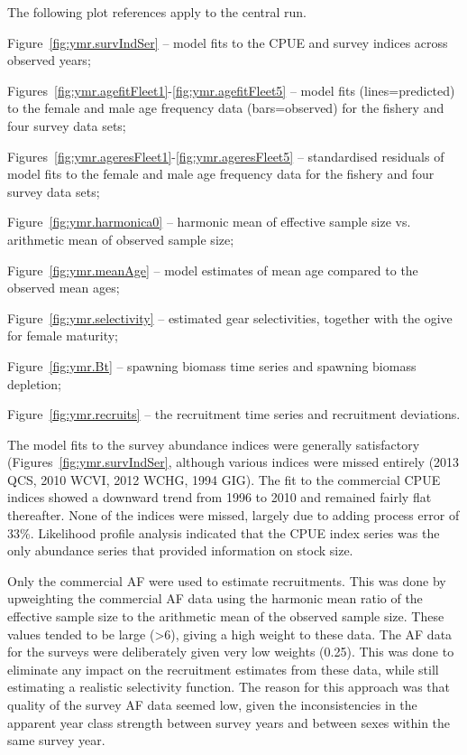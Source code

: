 \documentclass[11pt]{book}
\newcommand{\pc}{\%}
\begin{document}
The following plot references apply to the central run.
\begin{itemize_csas}{}{}
  \item Figure~\ref{fig:ymr.survIndSer} -- model fits to the CPUE and survey indices across observed years;
  \item Figures~\ref{fig:ymr.agefitFleet1}-\ref{fig:ymr.agefitFleet5} -- model fits (lines=predicted) to the female and male age frequency data (bars=observed) for the fishery and four survey data sets;
  \item Figures~\ref{fig:ymr.ageresFleet1}-\ref{fig:ymr.ageresFleet5} -- standardised residuals of model fits to the female and male age frequency data for the fishery and four survey data sets;
  \item Figure~\ref{fig:ymr.harmonica0} -- harmonic mean of effective sample size vs. arithmetic mean of observed sample size;
  \item Figure~\ref{fig:ymr.meanAge} -- model estimates of mean age compared to the observed mean ages;
  \item Figure~\ref{fig:ymr.selectivity} -- estimated gear selectivities, together with the ogive for female maturity;
  \item Figure~\ref{fig:ymr.Bt} -- spawning biomass time series and spawning biomass depletion;
  \item Figure~\ref{fig:ymr.recruits} -- the recruitment time series and recruitment deviations.
\end{itemize_csas}


The model fits to the survey abundance indices were generally satisfactory (Figures~\ref{fig:ymr.survIndSer}, although various indices were missed entirely (2013 QCS, 2010 WCVI, 2012 WCHG, 1994 GIG).
The fit to the commercial CPUE indices showed a downward trend from 1996 to 2010 and remained fairly flat thereafter.
None of the indices were missed, largely due to adding process error of 33\pc.
Likelihood profile analysis indicated that the CPUE index series was the only abundance series that provided information on stock size.

Only the commercial AF were used to estimate recruitments.
This was done by upweighting the commercial AF data using the harmonic mean ratio of the effective sample size to the arithmetic mean of the observed sample size.
These values tended to be large (>6), giving a high weight to these data.
The AF data for the surveys were deliberately given very low weights (0.25).
This was done to eliminate any impact on the recruitment estimates from these data, while still estimating a realistic selectivity function.
The reason for this approach was that quality of the survey AF data seemed low, given the inconsistencies in the apparent year class strength between survey years and between sexes within the same survey year.
\end{document}
